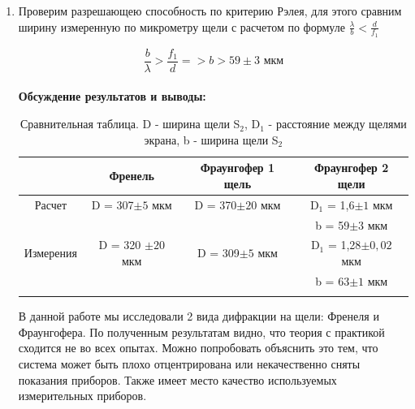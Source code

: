 \documentclass[a4paper, 12pt]{article}%
\begin{document}
\begin{enumerate}
\item Проверим разрешающею способность по критерию Рэлея, для этого сравним ширину измеренную по микрометру щели с расчетом по формуле $\frac{\lambda}{b} < \frac{d}{f_1}$


$$ \frac{b}{\lambda} > \frac{f_1}{d} => b > 59 \pm 3 \text{ мкм}$$\\

\textbf{Обсуждение результатов и выводы: }\\


\begin{longtable}{|c|c|c|c|}
	\hline
 & Френель & Фраунгофер 1 щель & Фраунгофер 2 щели\\ \hline
	Расчет & D = 307$\pm 5$ мкм& D = 370$\pm 20$ мкм &  D$_1$ = 1,6$\pm 1$ мкм\\ 
	& & & b = 59$\pm 3$ мкм \\ \hline
	
	Измерения & D = 320 $\pm 20$ мкм & D = 309$\pm 5$ мкм & D$_1$ = 1,28$\pm 0,02$ мкм\\ 
	& & & b = 63$\pm 1$ мкм\\ \hline

	\caption{Сравнительная таблица. D - ширина щели S$_2$, D$_1$ - расстояние между щелями экрана, b -  ширина щели S$_2$}
\end{longtable}

В данной работе мы исследовали 2 вида дифракции на щели: Френеля и Фраунгофера. По полученным результатам видно, что теория с практикой сходится не во всех опытах. Можно попробовать объяснить это тем, что система может быть плохо отцентрирована или некачественно сняты показания приборов. Также имеет место качество используемых измерительных приборов.


\end{enumerate}
	
\end{document}
